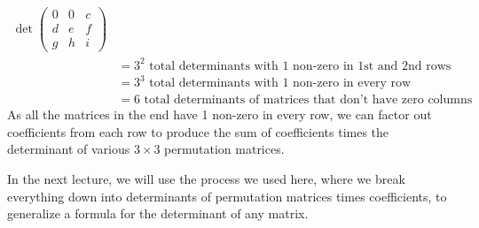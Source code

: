 \documentclass[12pt]{amsart}
\begin{document}
\begin{itemize}
\begin{align*}
		\det \begin{pmatrix}0&0&c\\d&e&f\\g&h&i\end{pmatrix}\\
		&= \text{$3^2$ total determinants with 1 non-zero in 1st and 2nd rows}\\
		&= \text{$3^3$ total determinants with 1 non-zero in every row}\\
		&= \text{$6$ total determinants of matrices that don't have zero columns}
	\end{align*}
	As all the matrices in the end have 1 non-zero in every row, we can factor out coefficients from each row to produce the sum of coefficients times the determinant of various $3 \times 3$ permutation matrices.
\end{itemize}
In the next lecture, we will use the process we used here, where we break everything down into determinants of permutation matrices times coefficients, to generalize a formula for the determinant of any matrix.
\end{document}
